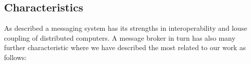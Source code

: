 

\subsection{Characteristics}
As described a messaging system has its strengths in interoperability and louse
coupling of distributed computers. A message broker in turn has also many further
characteristic where we have described the most related to our work as follows:  

